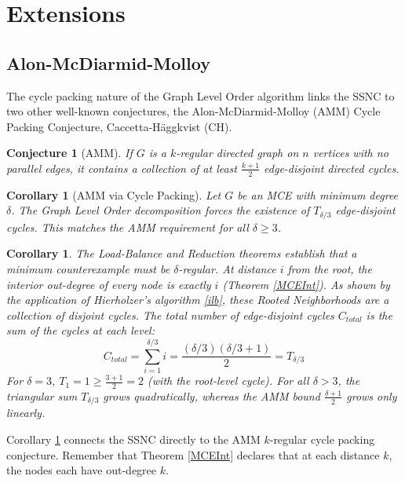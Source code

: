 \documentclass[AMS, Times1COL]{article} %
\newtheorem{corollary}[theorem]{Corollary}
\newtheorem{conjecture}[theorem]{Conjecture}
\theoremstyle{definition}
\begin{document}
	\section{Extensions}\label{furthework}
	\subsection{Alon-McDiarmid-Molloy}\label{further Work}
	
	The cycle packing nature of the Graph Level Order algorithm links the SSNC to two other well-known conjectures, the Alon-McDiarmid-Molloy (AMM) Cycle Packing Conjecture, Caccetta-Häggkvist (CH).
	
	\begin{conjecture}[AMM]
		If $G$ is a $k$-regular directed graph on $n$ vertices with no parallel edges, it contains a collection of at least $\frac{k+1}{2}$ edge-disjoint directed cycles.
	\end{conjecture}
	
	
	
	\begin{corollary}[AMM via Cycle Packing]\label{ammthm}
		Let $G$ be an MCE with minimum degree $\delta$. The Graph Level Order decomposition forces the existence of $T_{\delta/3}$ edge-disjoint cycles. This matches the AMM requirement for all $\delta \ge 3$.
	\end{corollary}
	\begin{corollary}
		The Load-Balance and Reduction theorems establish that a minimum counterexample must be $\delta$-regular.
		At distance $i$ from the root, the interior out-degree of every node is exactly $i$ (Theorem \ref{MCEInt}). As shown by the application of Hierholzer's algorithm \ref{ilb}, these Rooted Neighborhoods are a collection of disjoint cycles.
		The total number of edge-disjoint cycles $C_{total}$ is the sum of the cycles at each level:
		$$C_{total} = \sum_{i=1}^{\delta/3} i = \frac{(\delta/3)(\delta/3 + 1)}{2} = T_{\delta/3}$$
		For $\delta=3$, $T_1 = 1 \ge \frac{3+1}{2} = 2$ (with the root-level cycle). For all $\delta > 3$, the triangular sum $T_{\delta/3}$ grows quadratically, whereas the AMM bound $\frac{\delta+1}{2}$ grows only linearly.
	\end{corollary}
	
	Corollary \ref{ammthm} connects the SSNC directly to the AMM $k$-regular cycle packing conjecture. Remember that Theorem \ref{MCEInt} declares that at each distance $k$, the nodes each have out-degree $k$.
	
\end{document}
